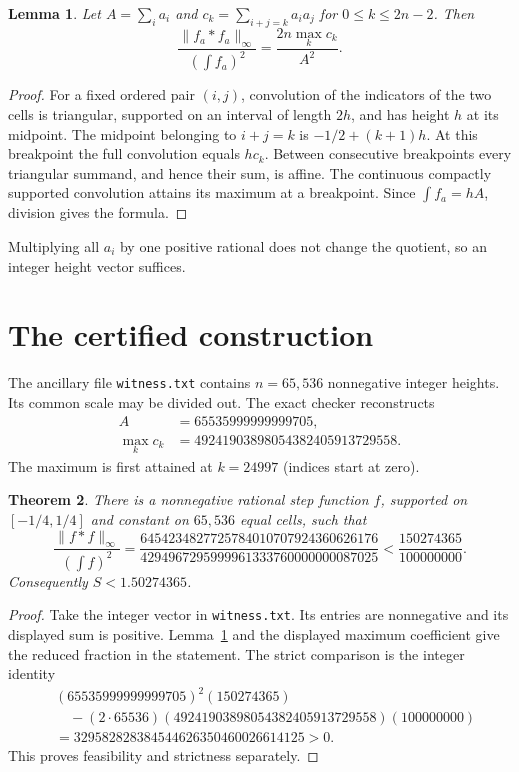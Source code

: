 \documentclass[11pt]{amsart}
\newtheorem{theorem}{Theorem}[section]
\newtheorem{lemma}[theorem]{Lemma}
\begin{document}
\begin{lemma}\label{lem:reduction}
Let $A=\sum_i a_i$ and $c_k=\sum_{i+j=k}a_i a_j$ for
$0\le k\le2n-2$. Then
\[
 \frac{\|f_a*f_a\|_\infty}{(\int f_a)^2}
 =\frac{2n\max_k c_k}{A^2}.
\]
\end{lemma}
\begin{proof}
For a fixed ordered pair $(i,j)$, convolution of the indicators of the two
cells is triangular, supported on an interval of length $2h$, and has height
$h$ at its midpoint. The midpoint belonging to $i+j=k$ is
$-1/2+(k+1)h$. At this breakpoint the full convolution equals $hc_k$.
Between consecutive breakpoints every triangular summand, and hence their
sum, is affine. The continuous compactly supported convolution attains its
maximum at a breakpoint. Since $\int f_a=hA$, division gives the formula.
\end{proof}
Multiplying all $a_i$ by one positive rational does not change the quotient,
so an integer height vector suffices.

\section{The certified construction}
The ancillary file \texttt{witness.txt} contains $n=65{,}536$ nonnegative
integer heights. Its common scale may be divided out. The exact checker
reconstructs
\begin{align*}
 A&=65535999999999705,\\
 \max_k c_k&=49241903898054382405913729558.
\end{align*}
The maximum is first attained at $k=24997$ (indices start at zero).

\begin{theorem}\label{thm:main}
There is a nonnegative rational step function $f$, supported on
$[-1/4,1/4]$ and constant on $65{,}536$ equal cells, such that
\[
 \frac{\|f*f\|_\infty}{(\int f)^2}
 =\frac{6454234827725784010707924360626176}{4294967295999961333760000000087025}
 <\frac{150274365}{100000000}.
\]
Consequently $S<1.50274365$.
\end{theorem}
\begin{proof}
Take the integer vector in \texttt{witness.txt}. Its entries are nonnegative
and its displayed sum is positive. Lemma~\ref{lem:reduction} and the displayed
maximum coefficient give the reduced fraction in the statement. The strict
comparison is the integer identity
\[
\begin{split}
 &(65535999999999705)^2(150274365)\\
 &\quad -(2\cdot65536)(49241903898054382405913729558)(100000000)\\
 &=329582828384544626350460026614125>0.
\end{split}
\]
This proves feasibility and strictness separately.
\end{proof}
\end{document}

